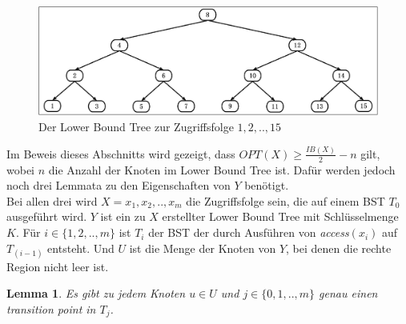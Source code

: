 \documentclass[a4paper,12pt]{article}
\newtheorem{Lemma}{Lemma}[section]
\begin{document}
\begin{figure}[H]
	\centering
	\includegraphics[width=1\textwidth]{Medien/Tango/lowerBoundTree}
	\caption{Der Lower Bound Tree zur Zugriffsfolge $1 ,2, .., 15$  }
	\label{fig:demlowerBoundTree}
\end{figure}

\noindent Im Beweis dieses Abschnitts wird gezeigt, dass $\mathit{OPT}\left(X\right) \geq \frac{\mathit{IB}\left(X\right)}{2} - n$ gilt, wobei $n$ die Anzahl der Knoten im Lower Bound Tree ist. Dafür werden jedoch noch drei Lemmata zu den Eigenschaften von $Y$ benötigt.\\
 Bei allen drei wird $X = x_1, x_2,.., x_m$ die Zugriffsfolge sein, die auf einem BST $T_0$ ausgeführt wird. $Y$ ist ein zu $X$ erstellter Lower Bound Tree mit Schlüsselmenge $K$.
Für $i \in \{1,2,..,m\}$ ist $T_i$ der BST der durch Ausführen von \textit{access}$\left(x_i\right)$ auf $T_{\left(i-1\right)}$ entsteht. Und $U$ ist die Menge der Knoten von $Y$, bei denen die rechte Region nicht leer ist.
\begin{Lemma} \label{demaineLemma1}
Es gibt zu jedem Knoten $u \in U$ und $j \in \{0,1,..,m\}$ genau einen transition point in $T_j$. 	
\end{Lemma}
\end{document}
